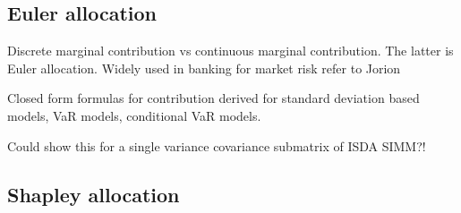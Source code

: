 \documentclass[../Thesis_AHoecherl.tex]{subfiles}
\begin{document}

\subsection{Euler allocation}

Discrete marginal contribution vs continuous marginal contribution. The latter is Euler allocation. Widely used in banking for market risk refer to Jorion

Closed form formulas for contribution derived for standard deviation based models, VaR models, conditional VaR models.

Could show this for a single variance covariance submatrix of ISDA SIMM?!

\subsection{Shapley allocation}

\end{document}
